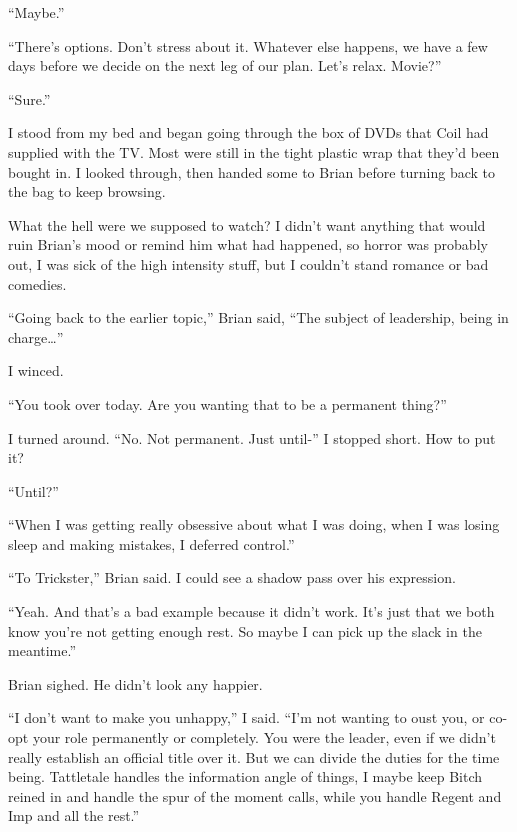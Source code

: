 ``Maybe.''



``There's options.  Don't stress about it.  Whatever else happens, we have a few days before we decide on the next leg of our plan.  Let's relax.  Movie?''



``Sure.''



I stood from my bed and began going through the box of DVDs that Coil had supplied with the TV.  Most were still in the tight plastic wrap that they'd been bought in.  I looked through, then handed some to Brian before turning back to the bag to keep browsing.



What the hell were we supposed to watch?  I didn't want anything that would ruin Brian's mood or remind him what had happened, so horror was probably out, I was sick of the high intensity stuff, but I couldn't stand romance or bad comedies.



``Going back to the earlier topic,'' Brian said, ``The subject of leadership, being in charge\ldots''



I winced.



``You took over today.  Are you wanting that to be a permanent thing?''



I turned around.  ``No.  Not permanent.  Just until-'' I stopped short.  How to put it?



``Until?''



``When I was getting really obsessive about what I was doing, when I was losing sleep and making mistakes, I deferred control.''



``To Trickster,'' Brian said.  I could see a shadow pass over his expression.



``Yeah.  And that's a bad example because it didn't work.  It's just that we both know you're not getting enough rest.  So maybe I can pick up the slack in the meantime.''



Brian sighed.  He didn't look any happier.



``I don't want to make you unhappy,'' I said.  ``I'm not wanting to oust you, or co-opt your role permanently or completely.  You were the leader, even if we didn't really establish an official title over it.  But we can divide the duties for the time being.  Tattletale handles the information angle of things, I maybe keep Bitch reined in and handle the spur of the moment calls, while you handle Regent and Imp and all the rest.''



